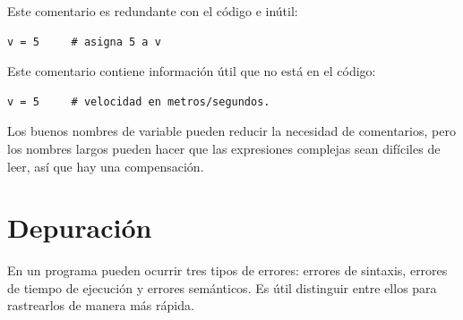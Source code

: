 \documentclass[10pt]{book}
\begin{document}
Este comentario es redundante con el código e inútil:

\begin{verbatim}
v = 5     # asigna 5 a v
\end{verbatim}
%
Este comentario contiene información útil que no está en el código:

\begin{verbatim}
v = 5     # velocidad en metros/segundos.
\end{verbatim}
%
Los buenos nombres de variable pueden reducir la necesidad de comentarios, pero
los nombres largos pueden hacer que las expresiones complejas sean difíciles de leer,
así que hay una compensación.


\section{Depuración}

En un programa pueden ocurrir tres tipos de errores: errores de sintaxis, errores
de tiempo de ejecución y errores semánticos.  Es útil
distinguir entre ellos para rastrearlos de manera más rápida.
\end{document}
